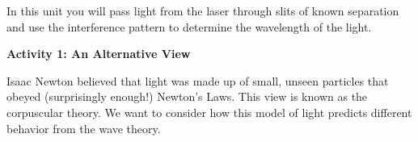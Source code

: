 \vspace{0.3cm}
{\centering {} \par}
\vspace{0.3cm}




In this unit you will pass light from the laser through slits of known
separation and use the interference pattern to determine the wavelength
of the light.

\textbf{Activity 1: An Alternative View}

Isaac Newton believed that light was made up of small, unseen particles
that obeyed (surprisingly enough!) Newton's Laws. This view is known
as the corpuscular theory. We want to consider how this model of light
predicts different behavior from the wave theory.

